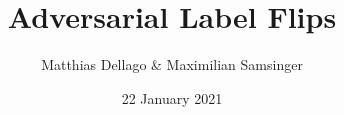 \documentclass[10pt,usepdftitle=false,aspectratio=169]{beamer}
\title{Adversarial Label Flips}
\author{Matthias Dellago \& Maximilian Samsinger}
\date{22 January 2021}
\begin{document}
\DeclarePairedDelimiter\abs{\lvert}{\rvert}%
\DeclarePairedDelimiter\norm{\lVert}{\rVert}%
\DeclarePairedDelimiter\ceil{\lceil}{\rceil}
\DeclarePairedDelimiter\floor{\lfloor}{\rfloor}

\begin{frame}[plain]
	\maketitle
\end{frame}	

%
%

\end{document}
